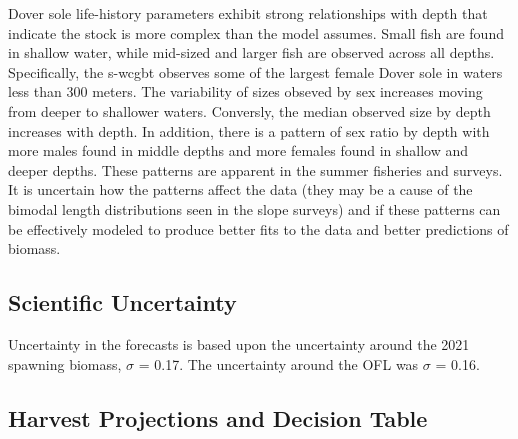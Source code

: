 \documentclass[11pt,
  english,
  a4paper,
]{article}
\begin{document}
Dover sole life-history parameters exhibit strong relationships with depth that indicate the stock is more complex than the model assumes. Small fish are found in shallow water, while mid-sized and larger fish are observed across all depths. Specifically, the \gls{s-wcgbt} observes some of the largest female Dover sole in waters less than 300 meters. The variability of sizes obseved by sex increases moving from deeper to shallower waters. Conversly, the median observed size by depth increases with depth. In addition, there is a pattern of sex ratio by depth with more males found in middle depths and more females found in shallow and deeper depths. These patterns are apparent in the summer fisheries and surveys. It is uncertain how the patterns affect the data (they may be a cause of the bimodal length distributions seen in the slope surveys) and if these patterns can be effectively modeled to produce better fits to the data and better predictions of biomass.

\leavevmode\tagmcend\tagstructend\par


\hypertarget{scientific-uncertainty}{%
\subsection*{Scientific Uncertainty}\label{scientific-uncertainty}}

\leavevmode\tagmcend\tagstructend


Uncertainty in the forecasts is based upon the uncertainty around the 2021 spawning biomass, {\(\sigma\)\leavevmode\tagmcend\tagstructend} = 0.17. The uncertainty around the OFL was {\(\sigma\)\leavevmode\tagmcend\tagstructend} = 0.16.

\leavevmode\tagmcend\tagstructend\par


\hypertarget{harvest-projections-and-decision-table}{%
\subsection*{Harvest Projections and Decision Table}\label{harvest-projections-and-decision-table}}
\end{document}
